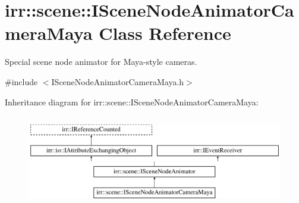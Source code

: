\hypertarget{classirr_1_1scene_1_1ISceneNodeAnimatorCameraMaya}{}\section{irr\+:\+:scene\+:\+:I\+Scene\+Node\+Animator\+Camera\+Maya Class Reference}
\label{classirr_1_1scene_1_1ISceneNodeAnimatorCameraMaya}


Special scene node animator for Maya-\/style cameras.  




{\ttfamily \#include $<$I\+Scene\+Node\+Animator\+Camera\+Maya.\+h$>$}

Inheritance diagram for irr\+:\+:scene\+:\+:I\+Scene\+Node\+Animator\+Camera\+Maya\+:\begin{figure}[H]
\begin{center}
\leavevmode
\includegraphics[height=4.000000cm]{classirr_1_1scene_1_1ISceneNodeAnimatorCameraMaya}
\end{center}
\end{figure}
